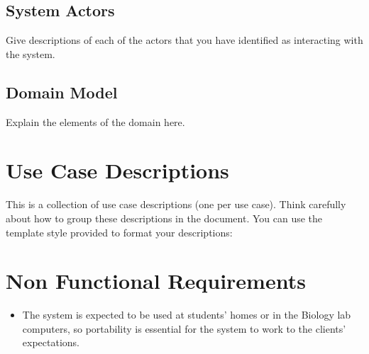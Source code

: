 \documentclass{l3deliverable}
\begin{document}

\subsection{System Actors} 

Give descriptions of each of the actors that you have identified as
interacting with the system.


\subsection{Domain Model}

Explain the elements of the domain here.


\section{Use Case Descriptions}

This is a collection of use case descriptions (one per use case).
Think carefully about how to group these descriptions in the document.
You can use the template style provided to format your descriptions:

\begin{UseCaseTemplate}
\UseCaseLabel{}
\UseCaseDescription{}
\UseCaseRationale{}
\UseCasePriority{}
\UseCaseStatus{}
\UseCaseActors{}
\UseCaseExtensions{}
\UseCaseIncludes{}
\UseCaseConditions{}
\UseCaseNonFunctionalRequirements{}
\UseCaseScenarios{}
\UseCaseRisks{}
\UseCaseUserInterface{}
\end{UseCaseTemplate}


\section{Non Functional Requirements}


\begin{itemize}
\item{
The system is expected to be used at students' homes or in the Biology
lab computers, so portability is essential for the system to work to
the clients' expectations.
}
\end{itemize}
\end{document}
